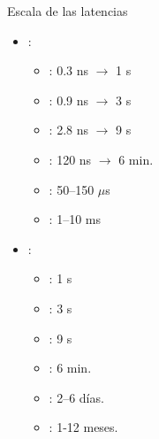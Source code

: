 \begin{frame}[t]{Escala de las latencias}
\begin{itemize}
  \item {}:
    \begin{itemize}
      \item {}: 0.3 ns $\rightarrow$ 1 s
      \item {}: 0.9 ns $\rightarrow$ 3 s
      \item {}: 2.8 ns $\rightarrow$ 9 s
      \item {}: 120 ns $\rightarrow$ 6 min.
      \item {}: 50--150 $\mu$s 
      \item {}: 1--10 ms
    \end{itemize}

  \pause
  \item {}:
    \begin{itemize}
      \item {}: 1 s
      \item {}: 3 s
      \item {}: 9 s
      \item {}: 6 min.
      \item {}: 2--6 días.
      \item {}: 1-12 meses.
    \end{itemize}
\end{itemize}
\end{frame}

